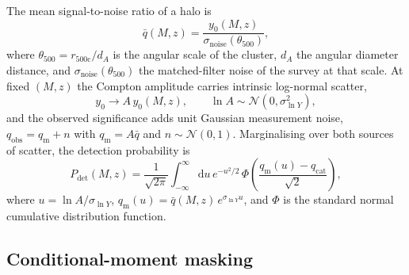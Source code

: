 \documentclass[aps,prd,twocolumn,superscriptaddress,nofootinbib,floatfix]{revtex4-2}
\newcommand{\dd}{\mathrm{d}}
\begin{document}
The mean signal-to-noise ratio of a halo is
\begin{equation}
    \bar q(M,z) = \frac{y_0(M,z)}{\sigma_{\mathrm{noise}}(\theta_{500})},
    \label{eq:snr_mean}
\end{equation}
where $\theta_{500} = r_{500\mathrm{c}} / d_A$ is the angular scale of the cluster, $d_A$ the angular diameter distance, and $\sigma_{\mathrm{noise}}(\theta_{500})$ the matched-filter noise of the survey at that scale.
At fixed $(M,z)$ the Compton amplitude carries intrinsic log-normal scatter,
\begin{equation}
    y_0 \to A\, y_0(M,z), \qquad \ln A \sim \mathcal{N}(0, \sigma_{\ln Y}^2),
    \label{eq:scatter}
\end{equation}
and the observed significance adds unit Gaussian measurement noise, $q_{\mathrm{obs}} = q_{\mathrm{m}} + n$ with $q_{\mathrm{m}} = A \bar q$ and $n \sim \mathcal{N}(0,1)$.
Marginalising over both sources of scatter, the detection probability is
\begin{equation}
    P_{\mathrm{det}}(M,z)
    = \frac{1}{\sqrt{2\pi}}
    \int_{-\infty}^{\infty} \dd u\, e^{-u^2/2}\,
    \Phi\!\left(\frac{q_{\mathrm{m}}(u) - q_{\mathrm{cat}}}{\sqrt{2}}\right),
    \label{eq:Pdet}
\end{equation}
where $u = \ln A / \sigma_{\ln Y}$, $q_{\mathrm{m}}(u) = \bar q(M,z)\, e^{\sigma_{\ln Y} u}$, and $\Phi$ is the standard normal cumulative distribution function.

\subsection{Conditional-moment masking}
\label{sec:conditional_moment}
\end{document}
